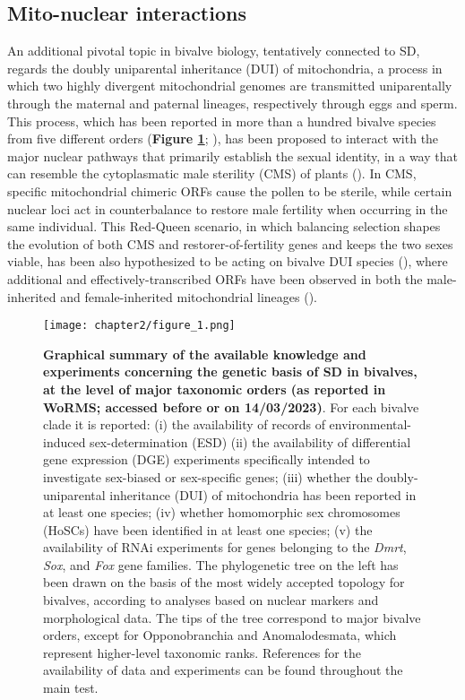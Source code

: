 \documentclass[../main.tex]{subfiles}
\begin{document}
\subsection{Mito-nuclear interactions}
An additional pivotal topic in bivalve biology, tentatively connected to SD, regards the doubly uniparental inheritance (DUI) of mitochondria, a process in which two highly divergent mitochondrial genomes are transmitted uniparentally through the maternal and paternal lineages, respectively through eggs and sperm. This process, which has been reported in more than a hundred bivalve species from five different orders (\textbf{Figure \ref{fig:summarySex}}; \textbf{\cite{gusman2016pursuing,capt2020unorthodox}}), has been proposed to interact with the major nuclear pathways that primarily establish the sexual identity, in a way that can resemble the cytoplasmatic male sterility (CMS) of plants (\textbf{\cite{ghiselli2013structure,breton2022did}}). In CMS, specific mitochondrial chimeric ORFs cause the pollen to be sterile, while certain nuclear loci act in counterbalance to restore male fertility when occurring in the same individual. This Red-Queen scenario, in which balancing selection shapes the evolution of both CMS and restorer-of-fertility genes and keeps the two sexes viable, has been also hypothesized to be acting on bivalve DUI species (\textbf{\cite{ghiselli2013structure,xu2022lack}}), where additional and effectively-transcribed ORFs have been observed in both the male-inherited and female-inherited mitochondrial lineages (\textbf{\cite{milani2013nuclear,milani2014paternally}}).

\begin{figure}
    \centering
    \texttt{[image: chapter2/figure\_1.png]}
    \captionsetup{width=\textwidth}
    \caption{
    \textbf{Graphical summary of the available knowledge and experiments concerning the genetic basis of SD in bivalves, at the level of major taxonomic orders (as reported in WoRMS; accessed before or on 14/03/2023)}. For each bivalve clade it is reported: (i) the availability of records of environmental-induced sex-determination (ESD) (ii) the availability of differential gene expression (DGE) experiments specifically intended to investigate sex-biased or sex-specific genes; (iii) whether the doubly-uniparental inheritance (DUI) of mitochondria has been reported in at least one species; (iv) whether homomorphic sex chromosomes (HoSCs) have been identified in at least one species; (v) the availability of RNAi experiments for genes belonging to the \textit{Dmrt}, \textit{Sox}, and \textit{Fox} gene families. The phylogenetic tree on the left has been drawn on the basis of the most widely accepted topology for bivalves, according to analyses based on nuclear markers and morphological data. The tips of the tree correspond to major bivalve orders, except for Opponobranchia and Anomalodesmata, which represent higher-level taxonomic ranks. References for the availability of data and experiments can be found throughout the main test.
    }
    \label{fig:summarySex}
\end{figure}
\end{document}
